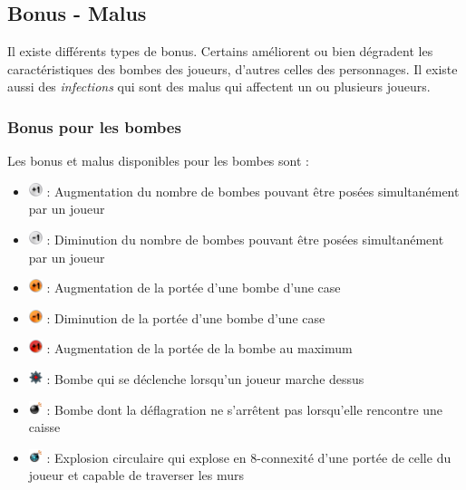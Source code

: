 \subsection{Bonus - Malus}

Il existe différents types de bonus. Certains améliorent ou bien dégradent les caractéristiques des bombes des joueurs, d'autres celles des personnages. Il existe aussi des \textit{infections} qui sont des malus qui affectent un ou plusieurs joueurs.

\subsubsection{Bonus pour les bombes}

Les bonus et malus disponibles pour les bombes sont :
\begin{itemize}
\item[] \includegraphics[width=15px,height=15px]{images/bombMore.png} : Augmentation du nombre de bombes pouvant être posées simultanément par un joueur
\item[] \includegraphics[width=15px,height=15px]{images/bombLess.png} : Diminution du nombre de bombes pouvant être posées simultanément par un joueur
\item[] \includegraphics[width=15px,height=15px]{images/rangeMore.png} : Augmentation de la portée d'une bombe d'une case
\item[] \includegraphics[width=15px,height=15px]{images/rangeLess.png} : Diminution de la portée d'une bombe d'une case
\item[] \includegraphics[width=15px,height=15px]{images/rangeMax.png} : Augmentation de la portée de la bombe au maximum
\item[] \includegraphics[width=15px,height=15px]{images/mineBonus.png} : Bombe qui se déclenche lorsqu'un joueur marche dessus
\item[] \includegraphics[width=15px,height=15px]{images/bomb.png} : Bombe dont la déflagration ne s'arrêtent pas lorsqu'elle rencontre une caisse
\item[] \includegraphics[width=15px,height=15px]{images/atomicBomb.png} : Explosion circulaire qui explose en 8-connexité d'une portée de celle du joueur et capable de traverser les murs
\end{itemize}

